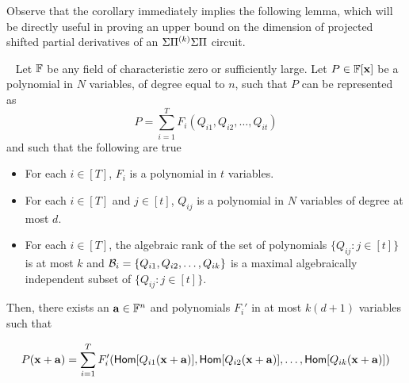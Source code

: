 

Observe that the corollary immediately implies the following lemma,  which will be directly useful in proving an upper bound on the dimension of projected shifted partial derivatives of an $\Sigma{\Pi^{(k)}}\Sigma\Pi$ circuit.  
\begin{lemma}~\label{lem:expressing as functions of the basis}
Let $\mathbb{F}$ be any  field of characteristic zero or sufficiently large. Let $P \in \mathbb{F}[\mathbf{x}]$ be a polynomial in $N$ variables, of degree equal to $n$, such that  $P$ can be represented as $$P = \sum_{i = 1}^T  F_{i}(Q_{i1}, Q_{i2}, \ldots, Q_{it})    $$
and such that the following are true
\begin{itemize}
\item For each $i \in[T]$, $F_i$ is a polynomial in $t$ variables. 
\item For each $i \in [T]$ and $j \in [t]$, $Q_{ij}$ is a polynomial in $N$ variables of degree at most $d$. 
\item For each $i \in [T]$, the algebraic rank of the set of polynomials $\{Q_{ij} : j \in [t]\}$ is at most $k$ and  ${\cal B}_i = \{Q_{i1}, Q_{i2}, \ldots, Q_{ik}\}$ is a maximal algebraically independent subset of $\{Q_{ij} : j \in [t]\}$. 
\end{itemize}
Then, there exists an $\mathbf{a} \in \mathbb{F}^{n}$ and polynomials $F_i'$ in at most $k(d+1)$ variables such that 

\begin{multline}
P(\mathbf{x} + \mathbf{a}) = \sum_{i = 1}^T  F_i'(\mathsf{Hom}[Q_{i1}(\mathbf{x} + \mathbf{a})], \mathsf{Hom}[Q_{i2}(\mathbf{x} + \mathbf{a})], \ldots, \mathsf{Hom}[Q_{ik}(\mathbf{x} + \mathbf{a})])
\end{multline}
\end{lemma}


